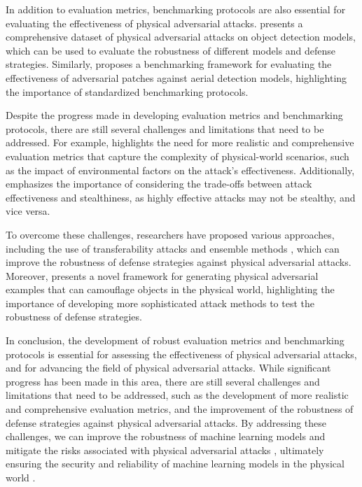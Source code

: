 \documentclass[11pt,a4paper]{article}
\begin{document}
In addition to evaluation metrics, benchmarking protocols are also essential for evaluating the effectiveness of physical adversarial attacks. \cite{doi:10.1007/978-3-030-58589-1_3} presents a comprehensive dataset of physical adversarial attacks on object detection models, which can be used to evaluate the robustness of different models and defense strategies. Similarly, \cite{doi:10.1109/tgrs.2022.3225306} proposes a benchmarking framework for evaluating the effectiveness of adversarial patches against aerial detection models, highlighting the importance of standardized benchmarking protocols.

Despite the progress made in developing evaluation metrics and benchmarking protocols, there are still several challenges and limitations that need to be addressed. For example, \cite{doi:10.1007/s11633-019-1211-x} highlights the need for more realistic and comprehensive evaluation metrics that capture the complexity of physical-world scenarios, such as the impact of environmental factors on the attack's effectiveness. Additionally, \cite{doi:10.1109/cvpr42600.2020.00108} emphasizes the importance of considering the trade-offs between attack effectiveness and stealthiness, as highly effective attacks may not be stealthy, and vice versa.

To overcome these challenges, researchers have proposed various approaches, including the use of transferability attacks \cite{arxiv:2104.02361} and ensemble methods \cite{doi:10.1109/asp-dac47756.2020.9045584}, which can improve the robustness of defense strategies against physical adversarial attacks. Moreover, \cite{doi:10.1109/cvpr52688.2022.01487} presents a novel framework for generating physical adversarial examples that can camouflage objects in the physical world, highlighting the importance of developing more sophisticated attack methods to test the robustness of defense strategies.

In conclusion, the development of robust evaluation metrics and benchmarking protocols is essential for assessing the effectiveness of physical adversarial attacks, and for advancing the field of physical adversarial attacks. While significant progress has been made in this area, there are still several challenges and limitations that need to be addressed, such as the development of more realistic and comprehensive evaluation metrics, and the improvement of the robustness of defense strategies against physical adversarial attacks. By addressing these challenges, we can improve the robustness of machine learning models and mitigate the risks associated with physical adversarial attacks \cite{arxiv:2209.09502}, ultimately ensuring the security and reliability of machine learning models in the physical world \cite{doi:10.1016/j.patcog.2022.109009}.
\end{document}
